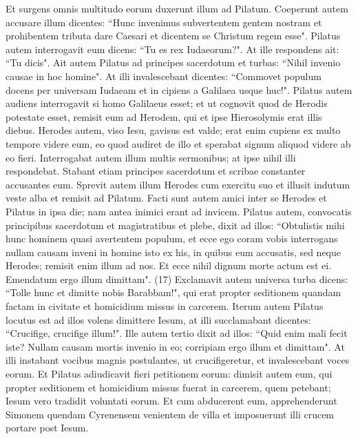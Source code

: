 \begin{biblechapter}  
\verse Et surgens omnis multitudo eorum duxerunt illum ad Pilatum. 
\verse Coeperunt autem accusare illum dicentes: “Hunc invenimus subvertentem gentem nostram et prohibentem tributa dare Caesari et dicentem se Christum regem esse". 
\verse Pilatus autem interrogavit eum dicens: “Tu es rex Iudaeorum?". At ille respondens ait: “Tu dicis". 
\verse Ait autem Pilatus ad principes sacerdotum et turbas: “Nihil invenio causae in hoc homine". 
\verse At illi invalescebant dicentes: “Commovet populum docens per universam Iudaeam et in cipiens a Galilaea usque huc!". 
\verse Pilatus autem audiens interrogavit si homo Galilaeus esset; 
\verse et ut cognovit quod de Herodis potestate esset, remisit eum ad Herodem, qui et ipse Hierosolymis erat illis diebus. 
\verse Herodes autem, viso Iesu, gavisus est valde; erat enim cupiens ex multo tempore videre eum, eo quod audiret de illo et sperabat signum aliquod videre ab eo fieri. 
\verse Interrogabat autem illum multis sermonibus; at ipse nihil illi respondebat. 
\verse Stabant etiam principes sacerdotum et scribae constanter accusantes eum. 
\verse Sprevit autem illum Herodes cum exercitu suo et illusit indutum veste alba et remisit ad Pilatum. 
\verse Facti sunt autem amici inter se Herodes et Pilatus in ipsa die; nam antea inimici erant ad invicem. 
\verse Pilatus autem, convocatis principibus sacerdotum et magistratibus et plebe, 
\verse dixit ad illos: “Obtulistis mihi hunc hominem quasi avertentem populum, et ecce ego coram vobis interrogans nullam causam inveni in homine isto ex his, in quibus eum accusatis, 
\verse sed neque Herodes; remisit enim illum ad nos. Et ecce nihil dignum morte actum est ei. 
\verse Emendatum ergo illum dimittam". (17) 
\verse Exclamavit autem universa turba dicens: “Tolle hunc et dimitte nobis Barabbam!", 
\verse qui erat propter seditionem quandam factam in civitate et homicidium missus in carcerem. 
\verse Iterum autem Pilatus locutus est ad illos volens dimittere Iesum, 
\verse at illi succlamabant dicentes: “Crucifige, crucifige illum!". 
\verse Ille autem tertio dixit ad illos: “Quid enim mali fecit iste? Nullam causam mortis invenio in eo; corripiam ergo illum et dimittam". 
\verse At illi instabant vocibus magnis postulantes, ut crucifigeretur, et invalescebant voces eorum. 
\verse Et Pilatus adiudicavit fieri petitionem eorum: 
\verse dimisit autem eum, qui propter seditionem et homicidium missus fuerat in carcerem, quem petebant; Iesum vero tradidit voluntati eorum. 
\verse Et cum abducerent eum, apprehenderunt Simonem quendam Cyrenensem venientem de villa et imposuerunt illi crucem portare post Iesum. 

\end{biblechapter}
